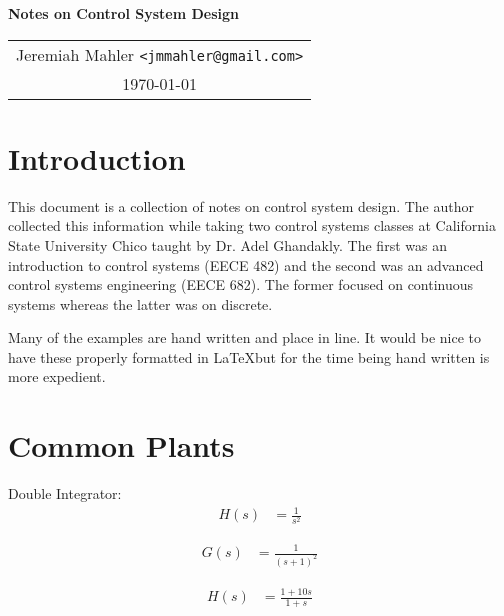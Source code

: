 \documentclass{article}
\begin{document}

\vspace*{0.5in}

\centerline{\LARGE \textbf{Notes on Control System Design}}
\vspace{0.2in}

\begin{center}
\begin{tabular}{c}
Jeremiah Mahler \texttt{<jmmahler@gmail.com>} \\
\today
\end{tabular}
\end{center}

\thispagestyle{empty}
\vfill
\pagebreak


\tableofcontents

\clearpage

\section{Introduction}

This document is a collection of notes on control system design.
The author collected this information while taking two control systems
classes at California State University Chico taught by Dr. Adel Ghandakly.
The first was an introduction to control systems (EECE 482) and
the second was an advanced control systems engineering (EECE 682).
The former focused on continuous systems whereas the latter was on
discrete.

Many of the examples are hand written and place in line.
It would be nice to have these properly formatted in \LaTeX but
for the time being hand written is more expedient.

\section{Common Plants}

\nocite{ogata1995discrete}
\nocite{franklin1998digital}

Double Integrator:
\begin{align*}
	H(s) &= \frac{1}{s^2}
\end{align*}

\begin{align*}
	G(s) &= \frac{1}{(s + 1)^2}
\end{align*}

\begin{align*}
	H(s) &= \frac{1 + 10s}{1 + s}
\end{align*}
\end{document}
